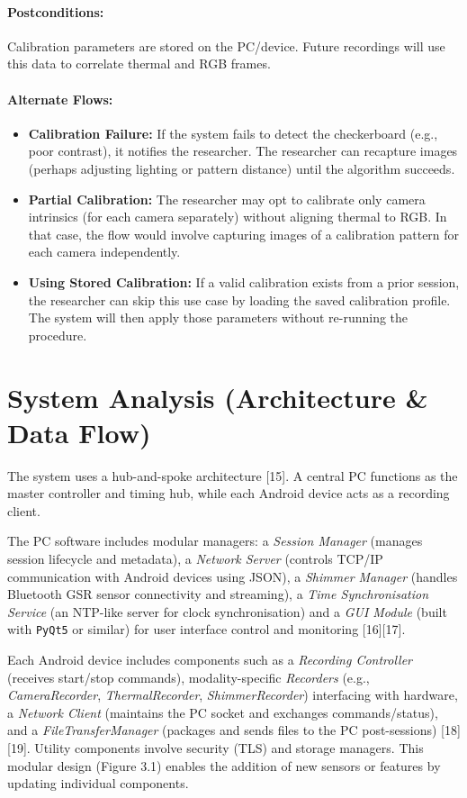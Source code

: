 \paragraph{Postconditions:} Calibration parameters are stored on the PC/device. Future recordings will use this data to correlate thermal and RGB frames.

\paragraph{Alternate Flows:}
\begin{itemize}
    \item \textbf{Calibration Failure:} If the system fails to detect the checkerboard (e.g., poor contrast), it notifies the researcher. The researcher can recapture images (perhaps adjusting lighting or pattern distance) until the algorithm succeeds.
    \item \textbf{Partial Calibration:} The researcher may opt to calibrate only camera intrinsics (for each camera separately) without aligning thermal to RGB. In that case, the flow would involve capturing images of a calibration pattern for each camera independently.
    \item \textbf{Using Stored Calibration:} If a valid calibration exists from a prior session, the researcher can skip this use case by loading the saved calibration profile. The system will then apply those parameters without re-running the procedure.
\end{itemize}


\section{System Analysis (Architecture \& Data Flow)}

The system uses a hub-and-spoke architecture [15]. A central PC functions as the master controller and timing hub, while each Android device acts as a recording client.

The PC software includes modular managers: a \textit{Session Manager} (manages session lifecycle and metadata), a \textit{Network Server} (controls TCP/IP communication with Android devices using JSON), a \textit{Shimmer Manager} (handles Bluetooth GSR sensor connectivity and streaming), a \textit{Time Synchronisation Service} (an NTP-like server for clock synchronisation) and a \textit{GUI Module} (built with \texttt{PyQt5} or similar) for user interface control and monitoring [16][17].

Each Android device includes components such as a \textit{Recording Controller} (receives start/stop commands), modality-specific \textit{Recorders} (e.g., \textit{CameraRecorder}, \textit{ThermalRecorder}, \textit{ShimmerRecorder}) interfacing with hardware, a \textit{Network Client} (maintains the PC socket and exchanges commands/status), and a \textit{FileTransferManager} (packages and sends files to the PC post-sessions) [18][19]. Utility components involve security (TLS) and storage managers. This modular design (Figure 3.1) enables the addition of new sensors or features by updating individual components.

